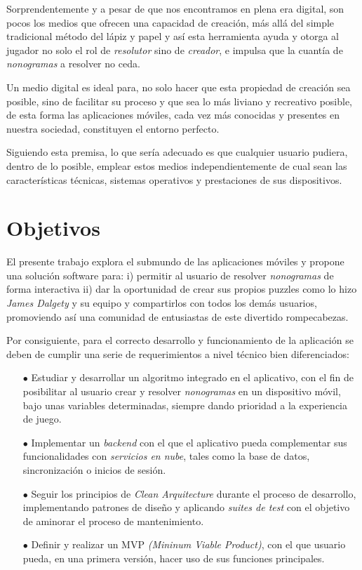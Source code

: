 \documentclass[11pt,spanish,listoffigures,listoftables]{tfgetsinf}
\begin{document}
Sorprendentemente y a pesar de que nos encontramos en plena era digital, son pocos los
medios que ofrecen una capacidad de creación, más allá del simple
tradicional método del lápiz y papel y así esta herramienta ayuda y otorga al jugador no solo el rol de \textit{resolutor} sino de \textit{creador},
e impulsa que la cuantía de \textit{nonogramas} a resolver no ceda.

Un medio digital es ideal para, no solo hacer que esta propiedad de creación sea posible, sino de facilitar su proceso 
y que sea lo más liviano y recreativo posible, de esta forma las aplicaciones móviles, cada vez más conocidas y presentes en nuestra sociedad, constituyen el entorno
perfecto.

Siguiendo esta premisa, lo que sería adecuado es que cualquier usuario pudiera, dentro de lo posible, emplear estos medios
independientemente de cual sean las características técnicas, sistemas operativos y prestaciones de sus dispositivos.

\section{Objetivos}

El presente trabajo explora el submundo de las aplicaciones móviles y propone
una solución software para: i) permitir al usuario de resolver \textit{nonogramas} de forma
interactiva ii) dar la oportunidad de crear sus propios puzzles como lo hizo
\textit{James Dalgety} y su equipo y compartirlos con todos los demás usuarios,
promoviendo así una comunidad de entusiastas de este divertido rompecabezas.

Por consiguiente, para el correcto desarrollo y funcionamiento de la aplicación se deben de
cumplir una serie de requerimientos a nivel técnico bien diferenciados:
\begin{itemize}
   \item[$\bullet$] Estudiar y desarrollar un algoritmo integrado en el aplicativo, con el fin de posibilitar al usuario
   crear y resolver \textit{nonogramas} en un dispositivo móvil, bajo unas variables determinadas, siempre dando prioridad a la experiencia de juego.
   \item[$\bullet$] Implementar un \textit{backend} con el que el aplicativo pueda complementar sus funcionalidades con \textit{servicios en nube},
   tales como la base de datos, sincronización o inicios de sesión.
   \item[$\bullet$] Seguir los principios de \textit{Clean Arquitecture} durante el proceso de desarrollo, implementando patrones de diseño y
   aplicando \textit{suites de test} con el objetivo de aminorar el proceso de mantenimiento.
   \item[$\bullet$] Definir y realizar un MVP \textit{(Mininum Viable Product)}, con el que usuario pueda, en una primera versión,
   hacer uso de sus funciones principales.
\end{itemize}
\end{document}
